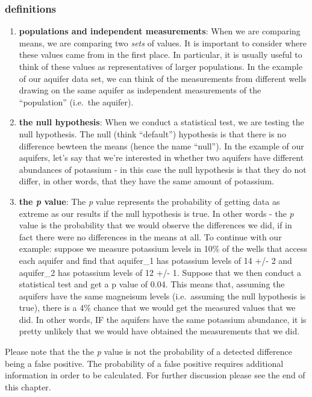 \documentclass[
]{krantz}
\begin{document}
\hypertarget{definitions}{%
\subsubsection{definitions}\label{definitions}}

\begin{enumerate}
\def\labelenumi{\arabic{enumi}.}
\item
  \textbf{populations and independent measurements}: When we are comparing means, we are comparing two \emph{sets} of values. It is important to consider where these values came from in the first place. In particular, it is usually useful to think of these values as representatives of larger populations. In the example of our aquifer data set, we can think of the measurements from different wells drawing on the same aquifer as independent measurements of the ``population'' (i.e.~the aquifer).
\item
  \textbf{the null hypothesis}: When we conduct a statistical test, we are testing the null hypothesis. The null (think ``default'') hypothesis is that there is no difference bewteen the means (hence the name ``null''). In the example of our aquifers, let's say that we're interested in whether two aquifers have different abundances of potassium - in this case the null hypothesis is that they do not differ, in other words, that they have the same amount of potassium.
\item
  \textbf{the \emph{p} value}: The \emph{p} value represents the probability of getting data as extreme as our results if the null hypothesis is true. In other words - the \emph{p} value is the probability that we would observe the differences we did, if in fact there were no differences in the means at all. To continue with our example: suppose we measure potassium levels in 10\% of the wells that access each aquifer and find that aquifer\_1 has potassium levels of 14 +/- 2 and aquifer\_2 has potassium levels of 12 +/- 1. Suppose that we then conduct a statistical test and get a p value of 0.04. This means that, assuming the aquifers have the same magneisum levels (i.e.~assuming the null hypothesis is true), there is a 4\% chance that we would get the measured values that we did. In other words, IF the aquifers have the same potassium abundance, it is pretty unlikely that we would have obtained the measurements that we did.
\end{enumerate}

Please note that the the \emph{p} value is not the probability of a detected difference being a false positive. The probability of a false positive requires additional information in order to be calculated. For further discussion please see the end of this chapter.
\end{document}
